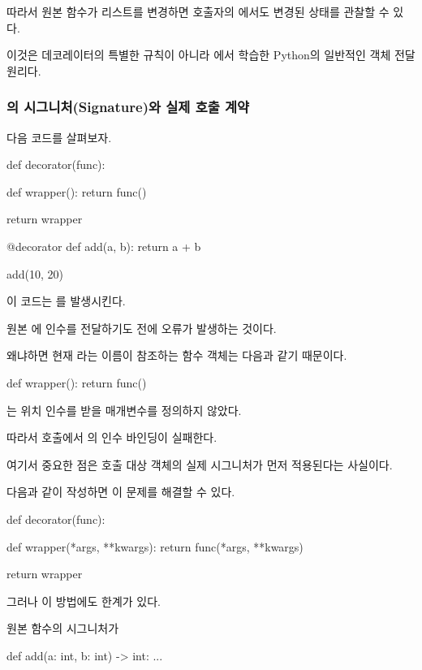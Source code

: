 따라서 원본 함수가 리스트를 변경하면 호출자의 에서도 변경된 상태를 관찰할 수 있다.

이것은 데코레이터의 특별한 규칙이 아니라 에서 학습한 Python의 일반적인 객체 전달 원리다.

\subsubsection{의 시그니처(Signature)와 실제 호출 계약}

다음 코드를 살펴보자.

\begin{dhkcode}
def decorator(func):

    def wrapper():
        return func()

    return wrapper


@decorator
def add(a, b):
    return a + b


add(10, 20)
\end{dhkcode}

이 코드는 를 발생시킨다.

원본 에 인수를 전달하기도 전에 오류가 발생하는 것이다.

왜냐하면 현재 라는 이름이 참조하는 함수 객체는 다음과 같기 때문이다.

\begin{dhkcode}
def wrapper():
    return func()
\end{dhkcode}

는 위치 인수를 받을 매개변수를 정의하지 않았다.

따라서  호출에서 의 인수 바인딩이 실패한다.

여기서 중요한 점은 호출 대상 객체의 실제 시그니처가 먼저 적용된다는 사실이다.

다음과 같이 작성하면 이 문제를 해결할 수 있다.

\begin{dhkcode}
def decorator(func):

    def wrapper(*args, **kwargs):
        return func(*args, **kwargs)

    return wrapper
\end{dhkcode}

그러나 이 방법에도 한계가 있다.

원본 함수의 시그니처가

\begin{dhkcode}
def add(a: int, b: int) -> int:
    ...
\end{dhkcode}

